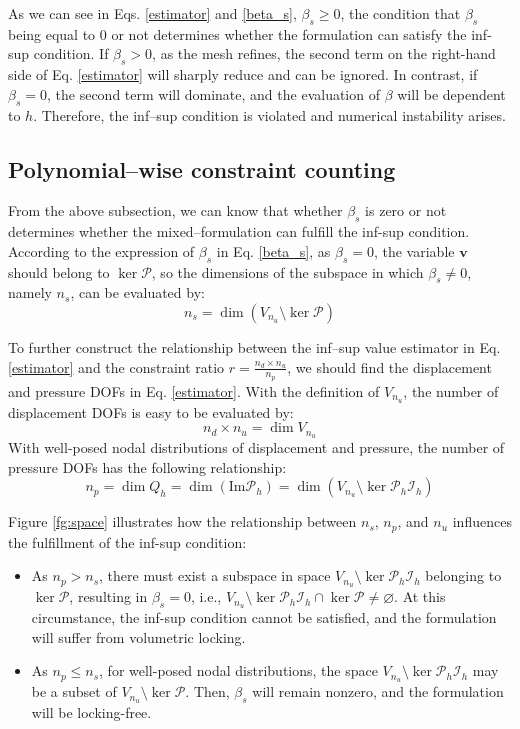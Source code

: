 As we can see in Eqs. \eqref{estimator} and \eqref{beta_s}, $\beta_s \ge 0$, the condition that $\beta_s$ being equal to $0$ or not determines whether the formulation can satisfy the inf-sup condition. If $\beta_s > 0$, as the mesh refines, the second term on the right-hand side of Eq. \eqref{estimator} will sharply reduce and can be ignored. In contrast, if $\beta_s = 0$, the second term will dominate, and the evaluation of $\beta$ will be dependent to $h$.
Therefore, the inf--sup condition is violated and numerical instability arises.

\subsection{Polynomial--wise constraint counting}

From the above subsection, we can know that whether $\beta_s$ is zero or not determines whether the mixed--formulation can fulfill the inf-sup condition. According to the expression of $\beta_s$ in Eq. \eqref{beta_s}, as $\beta_s = 0$, the variable $\boldsymbol{v}$ should belong to $\ker \mathcal{P}$, so the dimensions of the subspace in which $\beta_s \ne 0$, namely $n_s$, can be evaluated by:
\begin{equation}
n_s = \dim(V_{n_u} \setminus \ker \mathcal{P})
\end{equation}

To further construct the relationship between the inf--sup value estimator in Eq. \eqref{estimator} and the constraint ratio $r = \frac{n_d \times n_u}{n_p}$, we should find the displacement and pressure DOFs in Eq. \eqref{estimator}. With the definition of $V_{n_u}$, the number of displacement DOFs is easy to be evaluated by:
\begin{equation}
n_d \times n_u = \dim V_{n_u}
\end{equation}
With well-posed nodal distributions of displacement and pressure, the number of pressure DOFs has the following relationship:
\begin{equation}
n_p = \dim Q_h = \dim (\mathrm{Im} \mathcal{P}_h) = \dim (V_{n_u} \setminus \ker \mathcal{P}_h \mathcal{I}_h)
\end{equation}

Figure \ref{fg:space} illustrates how the relationship between $n_s$, $n_p$, and $n_u$ influences the fulfillment of the inf-sup condition:
\begin{itemize}
\item As $n_p > n_s$, there must exist a subspace in space $V_{n_u} \setminus \ker \mathcal{P}_h \mathcal{I}_h$ belonging to $\ker \mathcal{P}$, resulting in $\beta_s = 0$, i.e., $V_{n_u} \setminus \ker \mathcal{P}_h \mathcal{I}_h \cap \ker \mathcal{P} \neq \varnothing$. At this circumstance, the inf-sup condition cannot be satisfied, and the formulation will suffer from volumetric locking.

\item As $n_p \le n_s$, for well-posed nodal distributions, the space $V_{n_u} \setminus \ker \mathcal{P}_h \mathcal{I}_h$ may be a subset of $V_{n_u} \setminus \ker \mathcal{P}$. Then, $\beta_s$ will remain nonzero, and the formulation will be locking-free.
\end{itemize}

